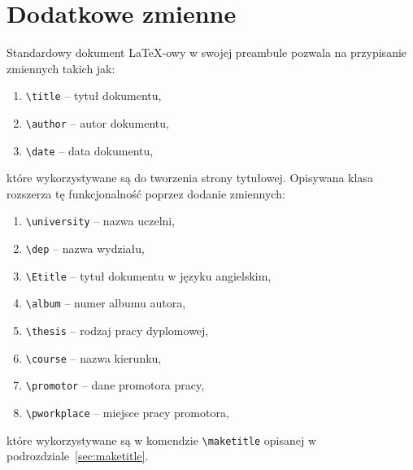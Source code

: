 \documentclass{SGGW-thesis}
\begin{document}
\section{Dodatkowe zmienne}
\label{sec:dodatkowe-zmienne}
Standardowy dokument \LaTeX-owy w swojej preambule pozwala na przypisanie zmiennych takich jak:
\begin{enumerate}[label=\alph*.]
\item{\verb|\title| -- tytuł dokumentu,}
\item{\verb|\author| -- autor dokumentu,}
\item{\verb|\date| -- data dokumentu,}
\end{enumerate}
które wykorzystywane są do tworzenia strony tytułowej. Opisywana klasa rozszerza tę funkcjonalność poprzez dodanie zmiennych:
\begin{enumerate}[label=\alph*.]
\item{\verb|\university| -- nazwa uczelni,}
\item{\verb|\dep| -- nazwa wydziału,}
\item{\verb|\Etitle| -- tytuł dokumentu w języku angielskim,}
\item{\verb|\album| -- numer albumu autora,}
\item{\verb|\thesis| -- rodzaj pracy dyplomowej,}
\item{\verb|\course| -- nazwa kierunku,}
\item{\verb|\promotor| -- dane promotora pracy,}
\item{\verb|\pworkplace| -- miejsce pracy promotora,}
\end{enumerate}
które wykorzystywane są w komendzie \verb|\maketitle| opisanej w podrozdziale~\ref{sec:maketitle}.
\end{document}
